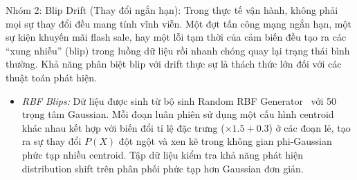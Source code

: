 Nhóm 2: Blip Drift (Thay đổi ngắn hạn): Trong thực tế vận hành, không phải mọi sự thay đổi đều mang tính vĩnh viễn. Một đợt tấn công mạng ngắn hạn, một sự kiện khuyến mãi flash sale, hay một lỗi tạm thời của cảm biến đều tạo ra các ``xung nhiễu'' (blip) trong luồng dữ liệu rồi nhanh chóng quay lại trạng thái bình thường. Khả năng phân biệt blip với drift thực sự là thách thức lớn đối với các thuật toán phát hiện.
\begin{itemize}
	\item \textit{RBF Blips:} Dữ liệu được sinh từ bộ sinh Random RBF Generator~\cite{river2021} với 50 trọng tâm Gaussian. Mỗi đoạn luân phiên sử dụng một cấu hình centroid khác nhau kết hợp với biến đổi tỉ lệ đặc trưng ($\times 1.5 + 0.3$) ở các đoạn lẻ, tạo ra sự thay đổi $P(X)$ đột ngột và xen kẽ trong không gian phi-Gaussian phức tạp nhiều centroid. Tập dữ liệu kiểm tra khả năng phát hiện distribution shift trên phân phối phức tạp hơn Gaussian đơn giản.
\end{itemize}

